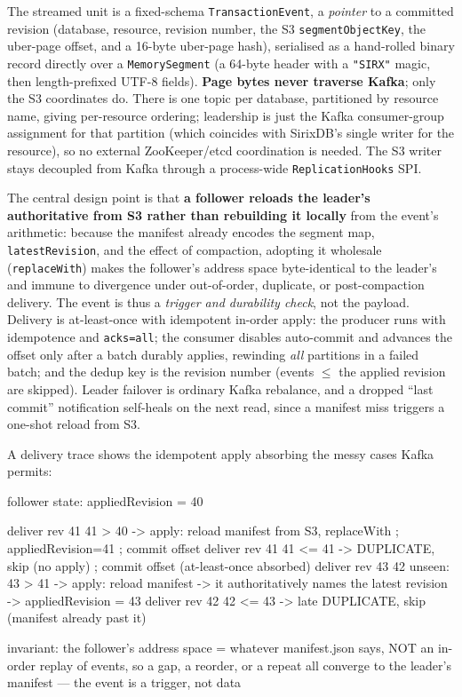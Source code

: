 \documentclass[11pt,a4paper,oneside]{report}
\newcommand{\dcap}[1]{\par\vspace{1pt}\noindent{\small\sffamily\bfseries\color{slate}#1}\par\vspace{-2pt}}
\theoremstyle{sirixthm}
\newcommand{\code}[1]{\texttt{#1}}
\begin{document}
The streamed unit is a fixed-schema \code{TransactionEvent}, a \emph{pointer} to a committed
revision (database, resource, revision number, the S3 \code{segmentObjectKey}, the uber-page offset,
and a 16-byte uber-page hash), serialised as a hand-rolled binary record directly over a
\code{MemorySegment} (a 64-byte header with a \code{"SIRX"} magic, then length-prefixed UTF-8
fields). \textbf{Page bytes never traverse Kafka}; only the S3 coordinates do. There is one topic
per database, partitioned by resource name, giving per-resource ordering; leadership is just the
Kafka consumer-group assignment for that partition (which coincides with SirixDB's single writer for
the resource), so no external ZooKeeper/etcd coordination is needed. The S3 writer stays decoupled
from Kafka through a process-wide \code{ReplicationHooks} SPI.

The central design point is that \textbf{a follower reloads the leader's authoritative
 from S3 rather than rebuilding it locally} from the event's arithmetic: because the
manifest already encodes the segment map, \code{latestRevision}, and the effect of compaction,
adopting it wholesale (\code{replaceWith}) makes the follower's address space byte-identical to the
leader's and immune to divergence under out-of-order, duplicate, or post-compaction delivery. The
event is thus a \emph{trigger and durability check}, not the payload. Delivery is at-least-once with
idempotent in-order apply: the producer runs with idempotence and \code{acks=all}; the consumer
disables auto-commit and advances the offset only after a batch durably applies, rewinding
\emph{all} partitions in a failed batch; and the dedup key is the revision number (events
$\le$ the applied revision are skipped). Leader failover is ordinary Kafka rebalance, and a dropped
``last commit'' notification self-heals on the next read, since a manifest miss triggers a one-shot
reload from S3.

A delivery trace shows the idempotent apply absorbing the messy cases Kafka permits:

\dcap{A follower under duplicate and out-of-order delivery}
\begin{diagramS}
follower state:  appliedRevision = 40

deliver rev 41   41 > 40  -> apply: reload manifest from S3, replaceWith ; appliedRevision=41 ; commit offset
deliver rev 41   41 <= 41 -> DUPLICATE, skip (no apply) ; commit offset           (at-least-once absorbed)
deliver rev 43   42 unseen: 43 > 41 -> apply: reload manifest -> it authoritatively names the latest
                 revision -> appliedRevision = 43
deliver rev 42   42 <= 43 -> late DUPLICATE, skip                                 (manifest already past it)

invariant: the follower's address space = whatever manifest.json says, NOT an in-order replay of events,
so a gap, a reorder, or a repeat all converge to the leader's manifest — the event is a trigger, not data
\end{diagramS}
\end{document}
